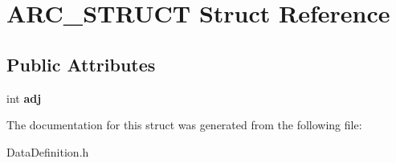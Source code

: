 \hypertarget{structARC__STRUCT}{\section{A\-R\-C\-\_\-\-S\-T\-R\-U\-C\-T Struct Reference}
\label{structARC__STRUCT}
}
\subsection*{Public Attributes}
\begin{DoxyCompactItemize}
\item 
\hypertarget{structARC__STRUCT_aed399ecc75eab66d87a638f46b12fff1}{int {\bfseries adj}}\label{structARC__STRUCT_aed399ecc75eab66d87a638f46b12fff1}

\end{DoxyCompactItemize}


The documentation for this struct was generated from the following file\-:\begin{DoxyCompactItemize}
\item 
Data\-Definition.\-h\end{DoxyCompactItemize}
